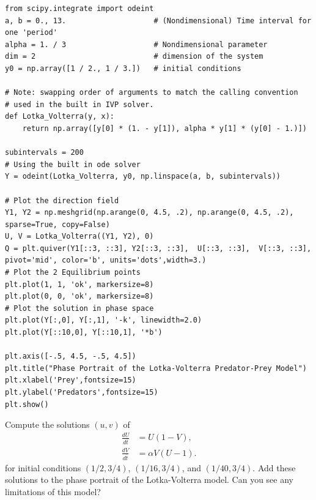 \begin{lstlisting}
from scipy.integrate import odeint
a, b = 0., 13.                    # (Nondimensional) Time interval for one 'period'
alpha = 1. / 3                    # Nondimensional parameter
dim = 2                           # dimension of the system
y0 = np.array([1 / 2., 1 / 3.])   # initial conditions

# Note: swapping order of arguments to match the calling convention
# used in the built in IVP solver.
def Lotka_Volterra(y, x):
    return np.array([y[0] * (1. - y[1]), alpha * y[1] * (y[0] - 1.)])

subintervals = 200
# Using the built in ode solver
Y = odeint(Lotka_Volterra, y0, np.linspace(a, b, subintervals))

# Plot the direction field
Y1, Y2 = np.meshgrid(np.arange(0, 4.5, .2), np.arange(0, 4.5, .2), sparse=True, copy=False)
U, V = Lotka_Volterra((Y1, Y2), 0)
Q = plt.quiver(Y1[::3, ::3], Y2[::3, ::3],  U[::3, ::3],  V[::3, ::3], pivot='mid', color='b', units='dots',width=3.)
# Plot the 2 Equilibrium points
plt.plot(1, 1, 'ok', markersize=8)
plt.plot(0, 0, 'ok', markersize=8)
# Plot the solution in phase space
plt.plot(Y[:,0], Y[:,1], '-k', linewidth=2.0)
plt.plot(Y[::10,0], Y[::10,1], '*b')

plt.axis([-.5, 4.5, -.5, 4.5])
plt.title("Phase Portrait of the Lotka-Volterra Predator-Prey Model")
plt.xlabel('Prey',fontsize=15)
plt.ylabel('Predators',fontsize=15)
plt.show()
\end{lstlisting}

\begin{problem}
Compute the solutions $(u,v)$ of 
\begin{align*}
	\frac{dU}{d\bar{t}} &= U(1-V),\\
	\frac{dV}{d\bar{t}} &= \alpha V (U-1).
\end{align*}
for initial conditions $(1/2, 3/4)$, $(1/16, 3/4)$, and $(1/40, 3/4)$.
Add these solutions to the phase portrait of the Lotka-Volterra model.
Can you see any limitations of this model? 
\end{problem}

